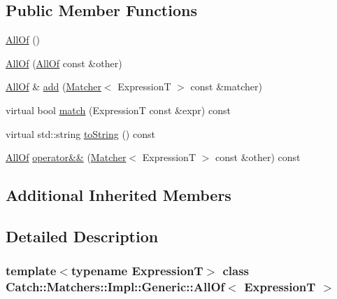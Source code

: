 \subsection*{Public Member Functions}
\begin{DoxyCompactItemize}
\item 
\hyperlink{class_catch_1_1_matchers_1_1_impl_1_1_generic_1_1_all_of_a9dfcc2f0549114f3b50cc65a2e10c996}{All\+Of} ()
\item 
\hyperlink{class_catch_1_1_matchers_1_1_impl_1_1_generic_1_1_all_of_a31f7c5e570e79bdf64064ee87c331a59}{All\+Of} (\hyperlink{class_catch_1_1_matchers_1_1_impl_1_1_generic_1_1_all_of}{All\+Of} const \&other)
\item 
\hyperlink{class_catch_1_1_matchers_1_1_impl_1_1_generic_1_1_all_of}{All\+Of} \& \hyperlink{class_catch_1_1_matchers_1_1_impl_1_1_generic_1_1_all_of_a8c5cd1e494ab697076da418ee72ac297}{add} (\hyperlink{struct_catch_1_1_matchers_1_1_impl_1_1_matcher}{Matcher}$<$ ExpressionT $>$ const \&matcher)
\item 
virtual bool \hyperlink{class_catch_1_1_matchers_1_1_impl_1_1_generic_1_1_all_of_a95231b6a455e1a646d0b54bce55138be}{match} (ExpressionT const \&expr) const
\item 
virtual std\+::string \hyperlink{class_catch_1_1_matchers_1_1_impl_1_1_generic_1_1_all_of_a8c8e7742501dc81e51a3c745d6f74119}{to\+String} () const
\item 
\hyperlink{class_catch_1_1_matchers_1_1_impl_1_1_generic_1_1_all_of}{All\+Of} \hyperlink{class_catch_1_1_matchers_1_1_impl_1_1_generic_1_1_all_of_aca6497aaa7fdb6560ebe850f32ccbf15}{operator\&\&} (\hyperlink{struct_catch_1_1_matchers_1_1_impl_1_1_matcher}{Matcher}$<$ ExpressionT $>$ const \&other) const
\end{DoxyCompactItemize}
\subsection*{Additional Inherited Members}


\subsection{Detailed Description}
\subsubsection*{template$<$typename ExpressionT$>$\newline
class Catch\+::\+Matchers\+::\+Impl\+::\+Generic\+::\+All\+Of$<$ Expression\+T $>$}



